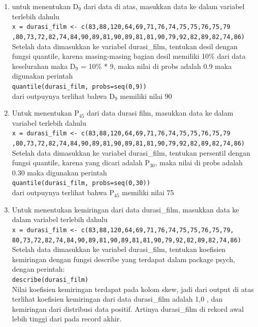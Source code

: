 \documentclass[a4paper,12pt]{article}
\begin{document}
\begin{enumerate}[label=\alph*.]
	\item untuk menentukan D$_{9}$ dari data di atas, masukkan data ke dalam variabel terlebih dahulu\\
	\texttt{x = durasi\_film <- c(83,88,120,64,69,71,76,74,75,75,76,75,79\\
		,80,73,72,82,74,84,90,89,81,90,89,81,81,90,79,92,82,89,82,74,86)\\}
	Setelah data dimasukkan ke variabel durasi\_film, tentukan desil dengan fungsi quantile, karena masing-masing bagian desil memiliki 10\% dari data keselurahan maka D$_{9}$ = 10\% * 9, maka nilai di probs adalah 0.9 maka digunakan perintah\\
	\texttt{quantile(durasi\_film, probs=seq(0,9))\\}
	dari outpuynya terlihat bahwa D$_{9}$ memiliki nilai 90
	
	\item Untuk menentukan P$_{45}$ dari data durasi film, masukkan data ke dalam variabel terlebih dahulu\\
	\texttt{x = durasi\_film <- c(83,88,120,64,69,71,76,74,75,75,76,75,79\\
		,80,73,72,82,74,84,90,89,81,90,89,81,81,90,79,92,82,89,82,74,86)\\}
	Setelah data dimasukkan ke variabel durasi\_film, tentukan persentil dengan fungsi quantile, karena yang dicari adalah P$_{30}$, maka nilai di probs adalah 0.30 maka digunakan perintah\\
	\texttt{quantile(durasi\_film, probs=seq(0,30))\\}
	dari outpuynya terlihat bahwa P$_{45}$ memiliki nilai 75
	
	\item Untuk menentukan kemiringan dari data durasi\_film, masukkan data ke dalam variabel terlebih dahulu\\
	\texttt{x = durasi\_film <- c(83,88,120,64,69,71,76,74,75,75,76,75,79,\\
		80,73,72,82,74,84,90,89,81,90,89,81,81,90,79,92,82,89,82,74,86)\\}
	Setelah data dimasukkan ke variabel durasi\_film, tentukan koefisien kemiringan dengan fungsi describe yang terdapat dalam package psych, dengan perintah:\\
	\texttt{describe(durasi\_film)}\\
	Nilai koefisien kemiringan terdapat pada kolom skew, jadi dari output di atas terlihat koefisien kemiringan dari data durasi\_film adalah 1,0 , dan kemiringan dari distribusi data positif. Artinya durasi\_film  di rekord awal lebih tinggi dari pada record akhir.
	

\end{enumerate}
\end{document}
